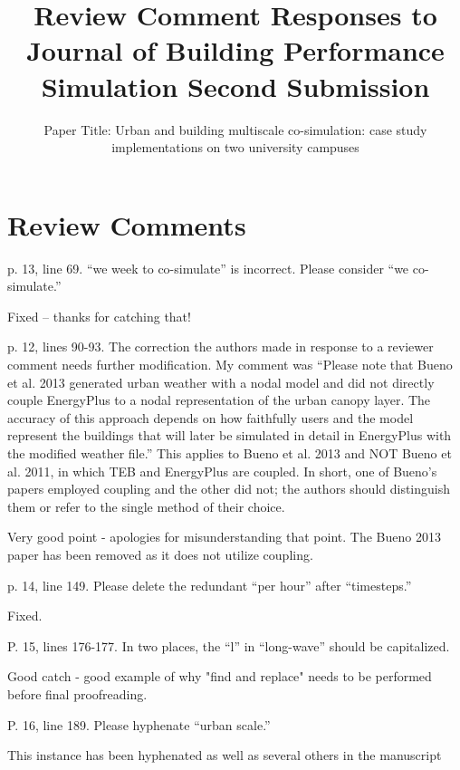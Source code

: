 \documentclass[answers,12pt]{exam}
\title{Review Comment Responses to Journal of Building Performance Simulation Second Submission}
\subtitle{Paper Title: Urban and building multiscale co-simulation: case study implementations on two university campuses 
}
\begin{document}
\maketitle

\section{Review Comments}
\begin{questions}

\question p. 13, line 69. “we week to co-simulate” is incorrect. Please consider “we co-simulate.”
\begin{solution}
Fixed -- thanks for catching that!
\end{solution}

\question  p. 12, lines 90-93. The correction the authors made in response to a reviewer comment
needs further modification. My comment was “Please note that Bueno et al. 2013 generated urban weather with a nodal model and did not directly couple EnergyPlus to a nodal representation of the urban canopy layer. The accuracy of this approach depends on how faithfully users and the model represent the buildings that will later be simulated in detail in EnergyPlus with the modified weather file.” This applies to Bueno et al. 2013 and NOT Bueno et al. 2011, in which TEB and EnergyPlus are coupled. In short, one of Bueno’s papers employed coupling and the other did not; the authors should distinguish them or refer to the single method of their choice.
\begin{solution}
Very good point - apologies for misunderstanding that point. The Bueno 2013 paper has been removed as it does not utilize coupling.
\end{solution}

\question p. 14, line 149. Please delete the redundant “per hour” after “timesteps.”
\begin{solution}
Fixed.
\end{solution}

\question P. 15, lines 176-177. In two places, the “l” in “long-wave” should be capitalized. 
\begin{solution}
Good catch - good example of why "find and replace" needs to be performed before final proofreading.
\end{solution}

\question P. 16, line 189. Please hyphenate “urban scale.”
\begin{solution}
This instance has been hyphenated as well as several others in the manuscript
\end{solution}


\end{questions}
\end{document}

